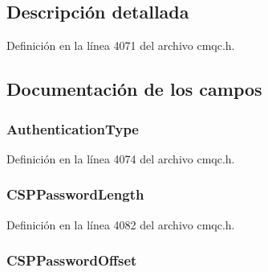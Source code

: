 \subsection{Descripción detallada}


Definición en la línea 4071 del archivo cmqc.\+h.



\subsection{Documentación de los campos}
\hypertarget{structtag_m_q_c_s_p_a93f1337530018caf4ee90bcd57f0b097}{}
\subsubsection[{Authentication\+Type}]{ Authentication\+Type}\label{structtag_m_q_c_s_p_a93f1337530018caf4ee90bcd57f0b097}


Definición en la línea 4074 del archivo cmqc.\+h.

\hypertarget{structtag_m_q_c_s_p_a0693ca8dafce34e22d0462b1fd124474}{}
\subsubsection[{C\+S\+P\+Password\+Length}]{ C\+S\+P\+Password\+Length}\label{structtag_m_q_c_s_p_a0693ca8dafce34e22d0462b1fd124474}


Definición en la línea 4082 del archivo cmqc.\+h.

\hypertarget{structtag_m_q_c_s_p_a335e93bfba0a58a7fa4b505df5cd727f}{}
\subsubsection[{C\+S\+P\+Password\+Offset}]{ C\+S\+P\+Password\+Offset}\label{structtag_m_q_c_s_p_a335e93bfba0a58a7fa4b505df5cd727f}


